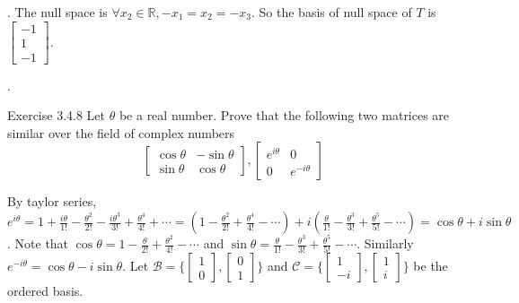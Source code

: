 \documentclass[8pt]{beamer}
\newcommand{\mbb}[1]{\mathbb{#1}}
\newcommand{\mc}[1]{\mathcal{#1}}
\begin{document}
\begin{frame}{.}
    The null space is $\forall x_2 \in \mbb{R}, -x_1 = x_2 = -x_3$.
    So the basis of null space of $T$ is $\left[\begin{matrix}
    -1 \\ 1 \\ -1
    \end{matrix}\right]$.

\end{frame}

\begin{frame}{.}
    \begin{block}{Exercise 3.4.8}
        Let $\theta$ be a real number.
        Prove that the following two matrices are similar over the field of complex numbers
        \[
            \left[\begin{matrix}
                \cos \theta & -\sin \theta \\ \sin \theta & \cos \theta
            \end{matrix}\right],
            \left[\begin{matrix}
                e^{i \theta} & 0 \\ 0 & e^{-i \theta}
            \end{matrix}\right]
        \]
    \end{block}
    By taylor series, $e^{i \theta} = 1 + \frac{i\theta}{1!} - \frac{\theta^2}{2!} - \frac{i\theta^3}{3!} + \frac{\theta^4}{4!} + \cdots = \left(1 - \frac{\theta^2}{2!} + \frac{\theta^4}{4!} - \cdots \right) + i\left(\frac{\theta}{1!} - \frac{\theta^3}{3!} + \frac{\theta^5}{5!} - \cdots \right) = \cos \theta + i \sin \theta$.
    Note that $\cos \theta = 1  - \frac{\theta}{2!} + \frac{\theta^2}{4!} -  \cdots $ and $\sin \theta =  \frac{\theta}{1!} - \frac{\theta^3}{3!} + \frac{\theta^5}{5!} - \cdots$.
    Similarly $e^{-i \theta} = \cos \theta - i \sin \theta$.
    Let $\mc{B} = \{ \left[\begin{matrix}
     1 \\ 0
    \end{matrix}\right], \left[\begin{matrix}
    0 \\ 1
    \end{matrix}\right] \}$ and $\mc{C} = \{\begin{bmatrix}
    1 \\ -i
    \end{bmatrix}, \begin{bmatrix}
    1 \\ i
    \end{bmatrix}\}$ be the ordered basis.

\end{frame}
\end{document}
